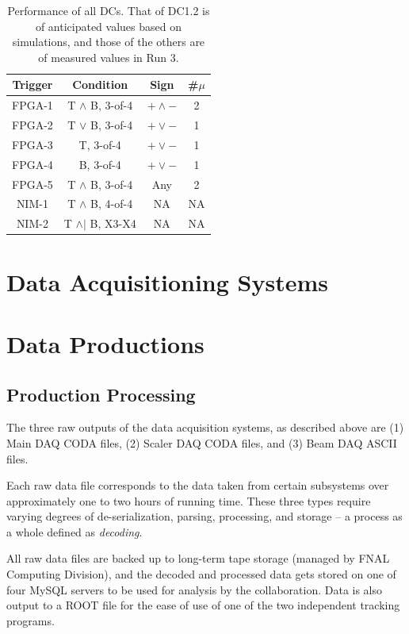 \begin{table}[bthp]\centering
  \caption{Performance of all DCs.
    That of DC1.2 is of anticipated values based on simulations,
    and those of the others are of measured values in Run 3.}
  \label{tab:cham:performance}
  \begin{tabular}{c|ccc}
    \hline
    Trigger & Condition       & Sign    & \#$\mu$ \\
    \hline
    FPGA-1   &    T $\land$ B, 3-of-4    &   $+\land-$    &   2 \\
    FPGA-2   &    T $\lor$ B, 3-of-4      &  $+\lor-$       &  1 \\
    FPGA-3     &  T, 3-of-4       &    $+\lor-$   &   1  \\
    FPGA-4    &   B, 3-of-4       &    $+\lor-$    &   1 \\
    FPGA-5  &     T $\land$ B, 3-of-4       &     Any  &   2  \\
    NIM-1  &     T $\land$ B, 4-of-4       &     NA    &   NA   \\
    NIM-2  &     T $\land |$ B, X3-X4       &     NA    &   NA   \\
    \hline
  \end{tabular}
\end{table}

\section{Data Acquisitioning Systems}

\section{Data Productions}

\subsection{Production Processing}

The three raw outputs of the data acquisition systems, as described above are (1) Main DAQ CODA files, (2) Scaler DAQ CODA files, and (3) Beam DAQ ASCII files.

Each raw data file corresponds to the data taken from certain subsystems over approximately one to two hours of running time. These three types require varying degrees of de-serialization, parsing, processing, and storage -- a process as a whole defined as \emph{decoding}. 

All raw data files are backed up to long-term tape storage (managed by FNAL Computing Division), and the decoded and processed data gets stored on one of four MySQL servers to be used for analysis by the collaboration. Data is also output to a ROOT file for the ease of use of one of the two independent tracking programs.

